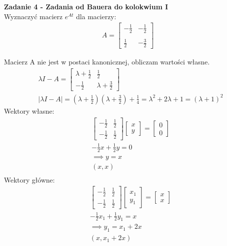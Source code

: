 \documentclass[a4paper,11pt]{article}
\begin{document}
\newpage
\begin{framed}
\textbf{Zadanie 4 - Zadania od Bauera do kolokwium I } \\ 
Wyznaczyć macierz \( e^{At} \) dla macierzy:
\begin{align*}
A = 
\begin{bmatrix}
-\frac{1}{2 }& -\frac{1}{2} \\ \\
\frac{1}{2} & -\frac{3}{2}
\end{bmatrix}
\end{align*}
\end{framed}
Macierz A nie jest w postaci kanonicznej, obliczam wartości własne.
\begin{align*}
&\lambda I - A = 
\begin{bmatrix}
\lambda+\frac{1}{2} & \frac{1}{2} \\
-\frac{1}{2} & \lambda+\frac{3}{2}
\end{bmatrix} \\
&|\lambda I - A |= (\lambda +\frac{1}{2})(\lambda+\frac{3}{2})+\frac{1}{4}=\lambda ^{2}+2\lambda + 1 = (\lambda+1)^{2} 
\end{align*}
Wektory własne: 
\begin{align*}
&\begin{bmatrix}
-\frac{1}{2} & \frac{1}{2} \\
-\frac{1}{2} & \frac{1}{2}
\end{bmatrix}
\begin{bmatrix}
x \\
y
\end{bmatrix}
=
\begin{bmatrix}
0 \\
0
\end{bmatrix} \\
&-\frac{1}{2}x+\frac{1}{2}y=0 \\
&\implies
y=x \\
& ( x , x ) \\
\end{align*}
Wektory główne:
\begin{align*}
&\begin{bmatrix}
-\frac{1}{2} & \frac{1}{2} \\
-\frac{1}{2} & \frac{1}{2}
\end{bmatrix}
\begin{bmatrix}
x_1 \\
y_1
\end{bmatrix}
=
\begin{bmatrix}
x \\
x
\end{bmatrix} \\
&-\frac{1}{2}x_1+\frac{1}{2}y_1=x \\
&\implies
y_1=x_1+2x \\
& ( x , x_1+2x ) \\
\end{align*}
\end{document}
